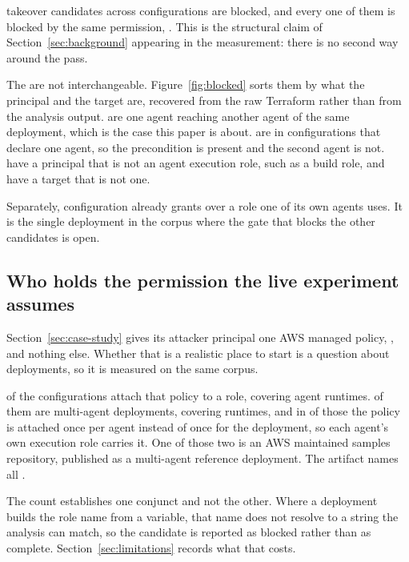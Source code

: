 \nBlocked takeover candidates across \nBlockedConfigs configurations are
blocked, and every one of them is blocked by the same permission,
. This is the structural claim of
Section~\ref{sec:background} appearing in the measurement: there is no second
way around the pass.



The \nBlocked are not interchangeable. Figure~\ref{fig:blocked} sorts them by
what the principal and the target are, recovered from the raw Terraform rather
than from the analysis output. \nBlockedAgentToAgent are one agent reaching
another agent of the same deployment, which is the case this paper is about.
\nBlockedSingleAgent are in configurations that declare one agent, so the
precondition is present and the second agent is not. \nBlockedPrincipalNotAgent
have a principal that is not an agent execution role, such as a build role, and
\nBlockedTargetNotAgent have a target that is not one.

Separately, \nPassRoleWide configuration already grants 
over a role one of its own agents uses. It is the single deployment in the
corpus where the gate that blocks the other \nBlocked candidates is open.

\subsection{Who holds the permission the live experiment assumes}
\label{sec:precondition-census}

Section~\ref{sec:case-study} gives its attacker principal one AWS managed
policy, , and nothing
else. Whether that is a realistic place to start is a question about
deployments, so it is measured on the same corpus.

\nManagedPolicyConfigs of the \nProjects configurations attach that policy to
a role, covering \nManagedPolicyRuntimes agent runtimes.
\nManagedPolicyMultiAgent of them are multi-agent deployments, covering
\nManagedPolicyMultiRuntimes runtimes, and in \nManagedPolicyPerAgent of those
\nManagedPolicyMultiAgent the policy is attached once per agent instead of
once for the deployment, so each agent's own execution role carries it. One of
those two is an AWS maintained samples repository, published as a multi-agent
reference deployment. The artifact names all \nManagedPolicyConfigs.

The count establishes one conjunct and not the other. Where a deployment builds
the role name from a variable, that name does not resolve to a string the
analysis can match, so the candidate is reported as blocked rather than as
complete. Section~\ref{sec:limitations} records what that costs.


